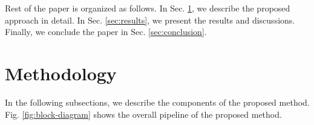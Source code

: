 \documentclass[conference]{IEEEtran}
\begin{document}
Rest of the paper is organized as follows. 
In Sec. \ref{sec:Methodology}, we describe the proposed approach in detail. In Sec. \ref{sec:results}, we present the results and discussions. Finally, we conclude the paper in Sec. \ref{sec:conclusion}.







\section{Methodology} \label{sec:Methodology}
In the following subsections, we describe the components of the proposed method. Fig. \ref{fig:block-diagram} shows the overall pipeline of the proposed method.
\end{document}
